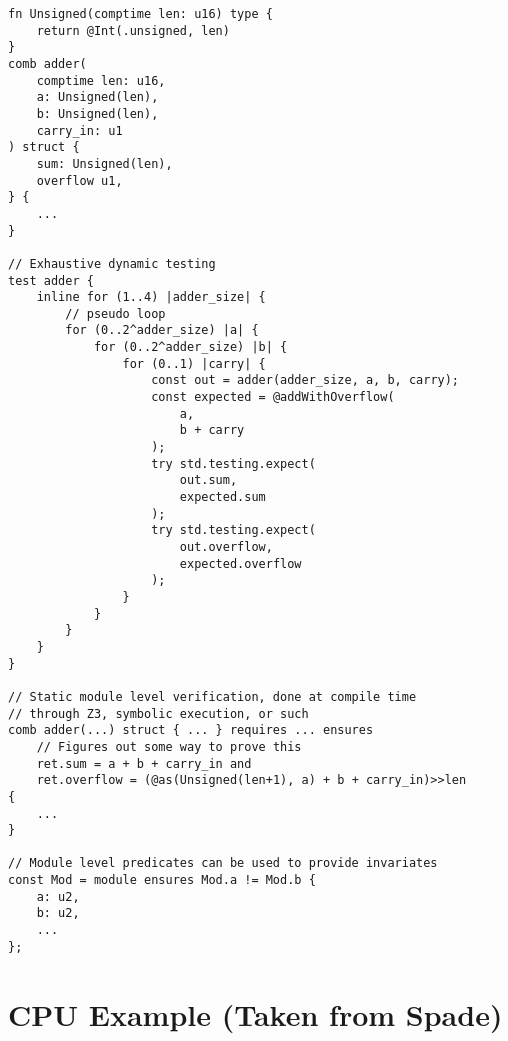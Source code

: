 \documentclass[10pt]{article}
\begin{document}
\begin{verbatim}
fn Unsigned(comptime len: u16) type {
    return @Int(.unsigned, len)
}
comb adder(
    comptime len: u16,
    a: Unsigned(len),
    b: Unsigned(len),
    carry_in: u1
) struct {
    sum: Unsigned(len),
    overflow u1,
} {
    ...
}

// Exhaustive dynamic testing
test adder {
    inline for (1..4) |adder_size| {
        // pseudo loop
        for (0..2^adder_size) |a| {
            for (0..2^adder_size) |b| {
                for (0..1) |carry| {
                    const out = adder(adder_size, a, b, carry);
                    const expected = @addWithOverflow(
                        a,
                        b + carry
                    );
                    try std.testing.expect(
                        out.sum,
                        expected.sum
                    );
                    try std.testing.expect(
                        out.overflow,
                        expected.overflow
                    );
                }
            }
        }
    }
}

// Static module level verification, done at compile time
// through Z3, symbolic execution, or such
comb adder(...) struct { ... } requires ... ensures 
    // Figures out some way to prove this
    ret.sum = a + b + carry_in and
    ret.overflow = (@as(Unsigned(len+1), a) + b + carry_in)>>len 
{
    ...
}

// Module level predicates can be used to provide invariates
const Mod = module ensures Mod.a != Mod.b {
    a: u2,
    b: u2,
    ...
};
\end{verbatim}

\section{CPU Example (Taken from Spade)}
\end{document}
